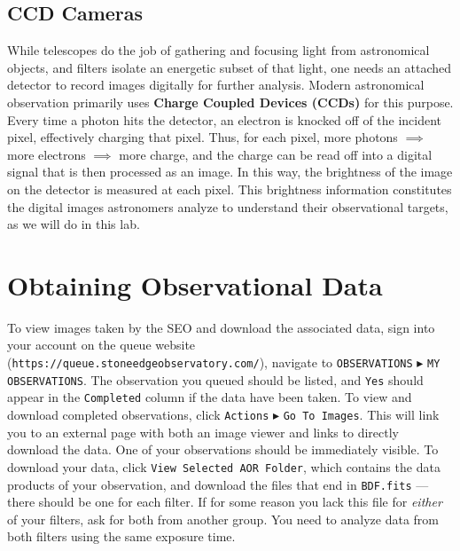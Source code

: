 \subsection{CCD Cameras}

While telescopes do the job of gathering and focusing light from astronomical objects, and filters isolate an energetic subset of that light, one needs an attached detector to record images digitally for further analysis. Modern astronomical observation primarily uses \textbf{Charge Coupled Devices (CCDs)} for this purpose. Every time a photon hits the detector, an electron is knocked off of the incident pixel, effectively charging that pixel. Thus, for each pixel, more photons $\implies$ more electrons $\implies$ more charge, and the charge can be read off into a digital signal that is then processed as an image. In this way, the brightness of the image on the detector is measured at each pixel. This brightness information constitutes the digital images astronomers analyze to understand their observational targets, as we will do in this lab. 

\section{Obtaining Observational Data}

To view images taken by the SEO and download the associated data, sign into your account on the queue website (\texttt{https://queue.stoneedgeobservatory.com/}), navigate to \texttt{OBSERVATIONS} $\blacktriangleright$ \texttt{MY OBSERVATIONS}. The observation you queued should be listed, and \texttt{Yes} should appear in the \texttt{Completed} column if the data have been taken. To view and download completed observations, click \texttt{Actions} $\blacktriangleright$ \texttt{Go To Images}. This will link you to an external page with both an image viewer and links to directly download the data. One of your observations should be immediately visible. To download your data, click \texttt{View Selected AOR Folder}, which contains the data products of your observation, and download the files that end in \texttt{BDF.fits} --- there should be one for each filter. If for some reason you lack this file for \textit{either} of your filters, ask for both from another group. You need to analyze data from both filters using the same exposure time.


